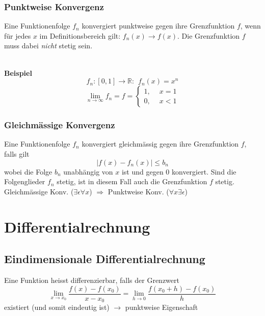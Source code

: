 \documentclass[8pt, a4paper, landscape, fleqn]{scrartcl}
\newenvironment {example}
				{\begin{itshape} \begin{small}}
				{\end{small} \end{itshape}}
\def\R{\mathbb{R}}
\begin{document}
\begin{multicols*}{3}
			    \subsubsection{Punktweise Konvergenz}
			        Eine Funktionenfolge $f_n$ konvergiert punktweise gegen ihre Grenzfunktion $f$, wenn für jedes $x$ im Definitionsbereich gilt: $f_n(x) \rightarrow f(x)$. Die Grenzfunktion $f$ muss dabei \textit{nicht} stetig sein. \\\\
					\begin{example}
						\textbf{Beispiel}
						\begin{equation*}
							f_n : [0,1] \rightarrow \R : \hspace{5pt} f_n(x) = x^n 
						 \end{equation*}
						 \begin{equation*}
						    \lim_{n\rightarrow \infty}f_n = f = 
							\begin{cases}
    							1, \hspace{5pt} &x=1\\
    							0, & x<1
    						\end{cases}
						\end{equation*}
					\end{example}
				\subsubsection{Gleichmässige Konvergenz}
				    Eine Funktionenfolge $f_n$ konvergiert gleichmässig gegen ihre Grenzfunktion $f$, falls gilt
				    \begin{equation*}
				        \vert f(x)-f_n(x) \vert \leq b_n
				    \end{equation*}
				    wobei die Folge $b_n$ unabhängig von $x$ ist und gegen $0$ konvergiert. Sind die Folgenglieder $f_n$ stetig, ist in diesem Fall auch die Grenzfunktion $f$ stetig.  \\
				    Gleichmässige Konv. ($\exists\epsilon\forall x$) $\Rightarrow$ Punktweise Konv. ($\forall x \exists\epsilon$)
				    
		\section{Differentialrechnung}
			\subsection{Eindimensionale Differentialrechnung}
				Eine Funktion heisst differenzierbar, falls der Grenzwert
				\begin{equation*}
					\lim_{x\rightarrow x_0} \frac{f(x)-f(x_0)}{x-x_0}=\lim_{h \rightarrow 0} \frac{f(x_0+h)-f(x_0)}{h}
				\end{equation*}
				existiert (und somit eindeutig ist) $\rightarrow$ punktweise Eigenschaft

\end{multicols*}
\end{document}
